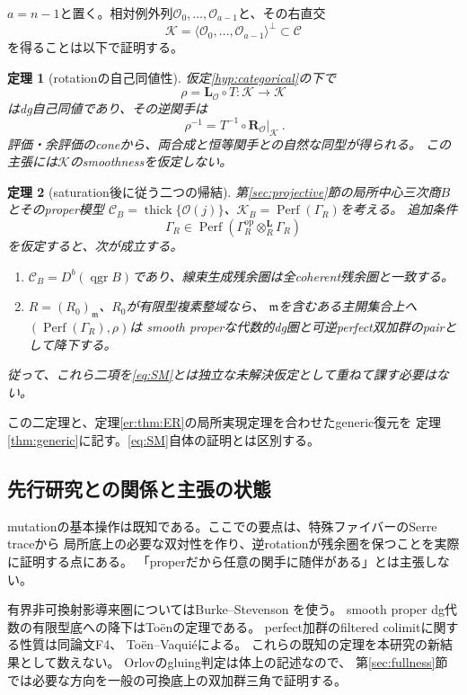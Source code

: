 \documentclass[a4paper,10pt]{ltjsarticle}
\newtheorem{theorem}{定理}[section]
\theoremstyle{definition}
\theoremstyle{remark}
\newcommand{\Perf}{\operatorname{Perf}}
\newcommand{\thick}{\operatorname{thick}}
\newcommand{\qgr}{\operatorname{qgr}}
\newcommand{\OO}{\mathcal O}
\newcommand{\cC}{\mathcal C}
\newcommand{\cK}{\mathcal K}
\newcommand{\otL}{\otimes^{\mathbf L}}
\newcommand{\LL}{\mathbf L}
\newcommand{\RR}{\mathbf R}
\begin{document}
$a=n-1$と置く。相対例外列$\OO_0,\ldots,\OO_{a-1}$と、その右直交
\[
 \cK=\langle\OO_0,\ldots,\OO_{a-1}\rangle^\perp\subset\cC
\]
を得ることは以下で証明する。

\begin{theorem}[rotationの自己同値性]\label{thm:rotation}
仮定\ref{hyp:categorical}の下で
\[
 \rho=\LL_{\OO}\circ T:\cK\longrightarrow\cK
\]
はdg自己同値であり、その逆関手は
\[
 \boxed{\ \rho^{-1}=T^{-1}\circ\RR_{\OO}\big|_{\cK}\ }.
 \tag{R}\label{eq:inverse}
\]
評価・余評価のconeから、両合成と恒等関手との自然な同型が得られる。
この主張には$\cK$のsmoothnessを仮定しない。
\end{theorem}

\begin{theorem}[saturation後に従う二つの帰結]\label{thm:summary}
第\ref{sec:projective}節の局所中心三次商$B$とそのproper模型
$\cC_B=\thick\{\OO(j)\}$、$\cK_B=\Perf(\Gamma_R)$を考える。
追加条件
\[
 \Gamma_R\in\Perf(\Gamma_R^{\mathrm{op}}\otL_R\Gamma_R)
 \tag{SM}\label{eq:SM}
\]
を仮定すると、次が成立する。
\begin{enumerate}[label=(\arabic*)]
\item $\cC_B=D^b(\qgr B)$であり、線束生成残余圏は全coherent残余圏と一致する。
\item $R=(R_0)_{\mathfrak m}$、$R_0$が有限型複素整域なら、
$\mathfrak m$を含むある主開集合上へ$(\Perf(\Gamma_R),\rho)$は
smooth properな代数的dg圏と可逆perfect双加群のpairとして降下する。
\end{enumerate}
従って、これら二項を\eqref{eq:SM}とは独立な未解決仮定として重ねて課す必要はない。
\end{theorem}

この二定理と、定理\ref{er:thm:ER}の局所実現定理を合わせたgeneric復元を
定理\ref{thm:generic}に記す。\eqref{eq:SM}自体の証明とは区別する。

\subsection{先行研究との関係と主張の状態}
mutationの基本操作は既知である。ここでの要点は、特殊ファイバーのSerre traceから
局所底上の必要な双対性を作り、逆rotationが残余圏を保つことを実際に証明する点にある。
「properだから任意の関手に随伴がある」とは主張しない。

有界非可換射影導来圏についてはBurke--Stevenson
\cite[Proposition 4.18, Lemmas 6.1--6.2, Theorem 6.4]{BS}を使う。
smooth proper dg代数の有限型底への降下はToën\cite[Théorème 1]{Toen}の定理である。
perfect加群のfiltered colimitに関する性質は同論文F4、
Toën--Vaquié\cite[Lemma 2.10]{TV}による。
これらの既知の定理を本研究の新結果として数えない。
Orlov\cite[Theorem 3.25]{Orlov}のgluing判定は体上の記述なので、
第\ref{sec:fullness}節では必要な方向を一般の可換底上の双加群三角で証明する。
\end{document}
